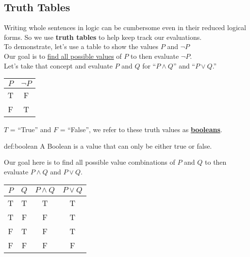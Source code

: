 \subsection{Truth Tables}
Writing whole sentences in logic can be cumbersome even in their reduced logical forms.
So we use \textbf{truth tables} to help keep track our evaluations.\\

\noindent
To demonstrate, let's use a table to show the values $P$ and $\neg P$\\
Our goal is to \underline{find all possible values} of $P$ to then evaluate $\neg P$.\\
Let's take that concept and evaluate $P$ and $Q$ for ``$P \land Q$'' and ``$P \lor Q$.''\\

\begin{center}
    \begin{tabular}{|c|c|}
        \hline
        \rowcolor{OliveGreen!10}
        $P$ & $\neg P$ \\
        \hline
        T   & F        \\
        F   & T        \\
        \hline
    \end{tabular}
\end{center}
\noindent
$T$ = ``True'' and $F$ = ``False'', we refer to these truth values as \underline{\textbf{booleans}}.\\


\begin{Def}[Boolean]{def:boolean}
    A Boolean is a value that can only be either true or false.
\end{Def}

\newpage

\noindent
Our goal here is to find all possible value combinations of $P$ and $Q$ to then evaluate $P \land Q$ and $P \lor Q$.\\


\begin{center}
    \begin{tabular}{|c|c|c|c|}
        \hline
        \rowcolor{OliveGreen!10}
        $P$ & $Q$ & $P \land Q$ & $P \lor Q$ \\
        \hline
        T   & T   & T           & T          \\
        T   & F   & F           & T          \\
        F   & T   & F           & T          \\
        F   & F   & F           & F          \\
        \hline
    \end{tabular}
\end{center}

